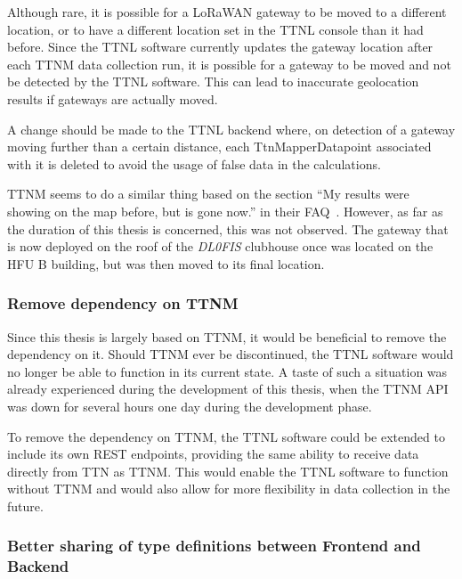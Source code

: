 Although rare, it is possible for a \ac{LoRaWAN} gateway to be moved to a different location, or to have a different location set in the \ac{TTNL} console than it had before.
Since the \ac{TTNL} software currently updates the gateway location after each \ac{TTNM} data collection run, it is possible for a gateway to be moved and not be detected by the \ac{TTNL} software.
This can lead to inaccurate geolocation results if gateways are actually moved.

A change should be made to the \ac{TTNL} backend where, on detection of a gateway moving further than a certain distance, each TtnMapperDatapoint associated with it is deleted to avoid the usage of false data in the calculations.

\ac{TTNM} seems to do a similar thing based on the section ``My results were showing on the map before, but is gone now.'' in their FAQ~\cite{ttn_mapper_faq_nodate}.
However, as far as the duration of this thesis is concerned, this was not observed.
The gateway that is now deployed on the roof of the \emph{DL0FIS} clubhouse once was located on the \ac{HFU} B building, but was then moved to its final location.

\subsubsection{Remove dependency on \acl{TTNM}}

Since this thesis is largely based on \ac{TTNM}, it would be beneficial to remove the dependency on it.
Should \ac{TTNM} ever be discontinued, the \ac{TTNL} software would no longer be able to function in its current state.
A taste of such a situation was already experienced during the development of this thesis, when the \ac{TTNM} \ac{API} was down for several hours one day during the development phase.

To remove the dependency on \ac{TTNM}, the \ac{TTNL} software could be extended to include its own \ac{REST} endpoints, providing the same ability to receive data directly from \ac{TTN} as \ac{TTNM}.
This would enable the \ac{TTNL} software to function without \ac{TTNM} and would also allow for more flexibility in data collection in the future.

\subsubsection{Better sharing of type definitions between Frontend and Backend}\label{subsubsec:outlook-sharing-type-definitions}


